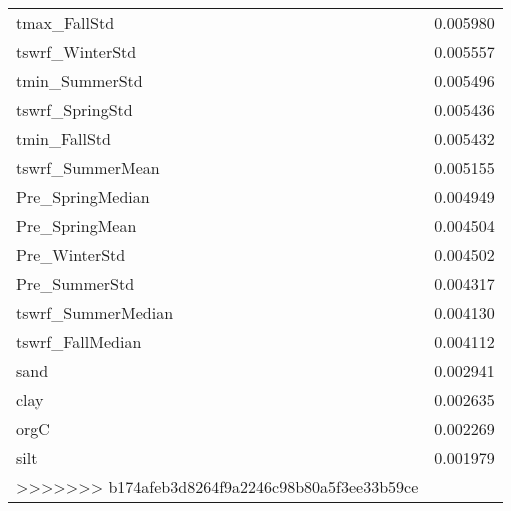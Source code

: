 \begin{tabular}{lr}
tmax_FallStd & 0.005980 \\
tswrf_WinterStd & 0.005557 \\
tmin_SummerStd & 0.005496 \\
tswrf_SpringStd & 0.005436 \\
tmin_FallStd & 0.005432 \\
tswrf_SummerMean & 0.005155 \\
Pre_SpringMedian & 0.004949 \\
Pre_SpringMean & 0.004504 \\
Pre_WinterStd & 0.004502 \\
Pre_SummerStd & 0.004317 \\
tswrf_SummerMedian & 0.004130 \\
tswrf_FallMedian & 0.004112 \\
sand & 0.002941 \\
clay & 0.002635 \\
orgC & 0.002269 \\
silt & 0.001979 \\
>>>>>>> b174afeb3d8264f9a2246c98b80a5f3ee33b59ce
\bottomrule
\end{tabular}
